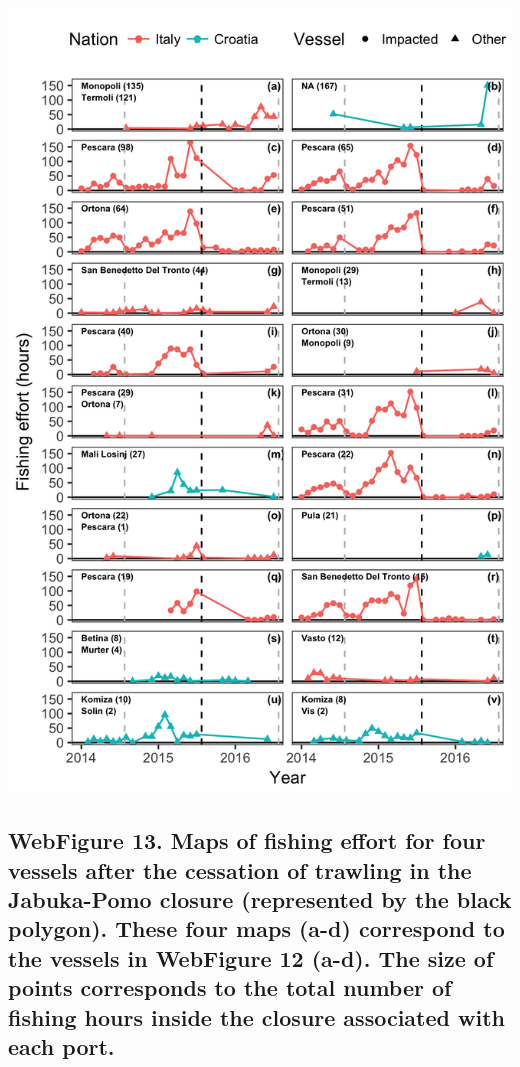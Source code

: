 \documentclass[11pt,]{article}
\begin{document}
\includegraphics[width=1.00000\textwidth]{../ms_1/ms_1_figs/plot_time_series_incursion_ves_after.png}

\newpage

\subsection{WebFigure 13. Maps of fishing effort for four vessels after
the cessation of trawling in the Jabuka-Pomo closure (represented by the
black polygon). These four maps (a-d) correspond to the vessels in
WebFigure 12 (a-d). The size of points corresponds to the total number
of fishing hours inside the closure associated with each
port.}\label{webfigure-13.-maps-of-fishing-effort-for-four-vessels-after-the-cessation-of-trawling-in-the-jabuka-pomo-closure-represented-by-the-black-polygon.-these-four-maps-a-d-correspond-to-the-vessels-in-webfigure-12-a-d.-the-size-of-points-corresponds-to-the-total-number-of-fishing-hours-inside-the-closure-associated-with-each-port.}
\end{document}
